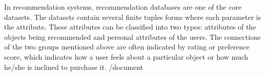 In recommendation systems, recommendation databases are one of the core datasets. The datasets contain several finite tuples forms where each parameter is the attribute. These attributes can be classified into two types: attributes of the objects being recommended and personal attributes of the users. The connections of the two groups mentioned above are often indicated by rating or preference score, which indicates how a user feels about a particular object or how much he/she is inclined to purchase it.
/document 